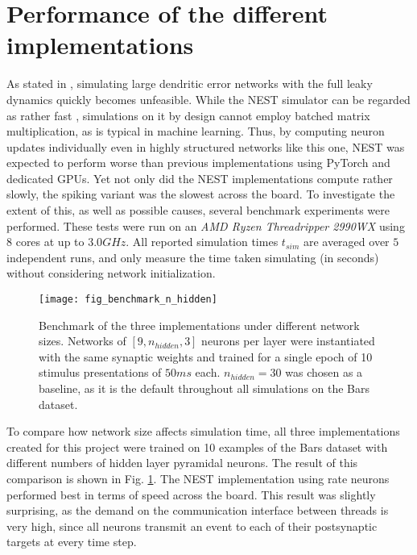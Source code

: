 \section{Performance of the different implementations}\label{sec-benchmark}

As stated in \citep{Haider2021}, simulating large dendritic error networks with the full leaky dynamics quickly becomes
unfeasible. While the NEST simulator can be regarded as rather fast \citep{albada2018performance}, simulations on it by
design cannot employ batched matrix multiplication, as is typical in machine learning. Thus, by computing neuron updates
individually even in highly structured networks like this one, NEST was expected to perform worse than previous
implementations using PyTorch and dedicated GPUs. Yet not only did the NEST implementations compute rather slowly, the
spiking variant was the slowest across the board. To investigate the extent of this, as well as possible causes, several
benchmark experiments were performed. These tests were run on an \textit{AMD Ryzen Threadripper 2990WX} using 8 cores at
up to $3.0GHz$. All reported simulation times $t_{sim}$ are averaged over $5$ independent runs, and only measure the
time taken simulating (in seconds) without considering network initialization. \newline


\begin{figure}[h]
    \centering
    \texttt{[image: fig\_benchmark\_n\_hidden]}
    \caption[Benchmark of the three implementations under different network sizes]{Benchmark of the three
        implementations under different network sizes. Networks of $[9, n_{hidden}, 3]$ neurons per layer  were
        instantiated with the same synaptic weights and trained for a single epoch of 10 stimulus presentations of
        $50ms$ each. $n_{hidden}=30$ was chosen as a baseline, as it is the default throughout all simulations on the
        Bars dataset.}
    \label{fig-benchmark-n-hidden}
\end{figure}


To compare how network size affects simulation time, all three implementations created for this project were trained on
10 examples of the Bars dataset with different numbers of hidden layer pyramidal neurons. The result of this comparison
is shown in Fig. \ref{fig-benchmark-n-hidden}.  The NEST implementation using rate neurons performed best in terms of
speed across the board. This result was slightly surprising, as the demand on the communication interface between
threads is very high, since all neurons transmit an event to each of their postsynaptic targets at every time step.

